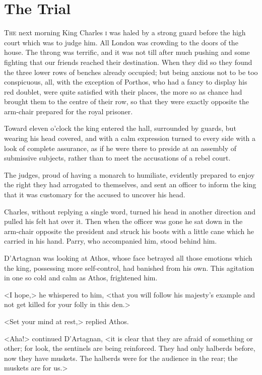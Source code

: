 \chapter{The Trial}

 \lettrine{T}{he} next morning King Charles \textsc{i}  was haled by a strong guard before the high court which was to judge him. All London was crowding to the doors of the house. The throng was terrific, and it was not till after much pushing and some fighting that our friends reached their destination. When they did so they found the three lower rows of benches already occupied; but being anxious not to be too conspicuous, all, with the exception of Porthos, who had a fancy to display his red doublet, were quite satisfied with their places, the more so as chance had brought them to the centre of their row, so that they were exactly opposite the arm-chair prepared for the royal prisoner.

Toward eleven o'clock the king entered the hall, surrounded by guards, but wearing his head covered, and with a calm expression turned to every side with a look of complete assurance, as if he were there to preside at an assembly of submissive subjects, rather than to meet the accusations of a rebel court.

The judges, proud of having a monarch to humiliate, evidently prepared to enjoy the right they had arrogated to themselves, and sent an officer to inform the king that it was customary for the accused to uncover his head.

Charles, without replying a single word, turned his head in another direction and pulled his felt hat over it. Then when the officer was gone he sat down in the arm-chair opposite the president and struck his boots with a little cane which he carried in his hand. Parry, who accompanied him, stood behind him.

D'Artagnan was looking at Athos, whose face betrayed all those emotions which the king, possessing more self-control, had banished from his own. This agitation in one so cold and calm as Athos, frightened him.

<I hope,> he whispered to him, <that you will follow his majesty's example and not get killed for your folly in this den.>

<Set your mind at rest,> replied Athos.

<Aha!> continued D'Artagnan, <it is clear that they are afraid of something or other; for look, the sentinels are being reinforced. They had only halberds before, now they have muskets. The halberds were for the audience in the rear; the muskets are for us.>

